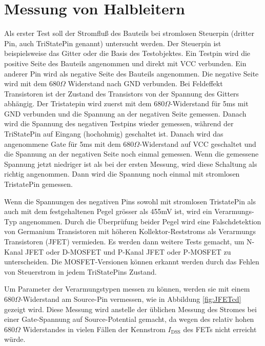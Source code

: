 \section{Messung von Halbleitern}
Als erster Test soll der Stromfluß des Bauteils bei stromlosen Steuerpin (dritter Pin, auch TriStatePin genannt)
untersucht werden. Der Steuerpin ist beispielsweise das Gitter oder die Basis des Testobjektes.
Ein Testpin wird die positive Seite des Bauteils angenommen und direkt mit VCC verbunden.
Ein anderer Pin wird als negative Seite des Bauteils angenommen.
Die negative Seite wird mit dem \(680\Omega\) Widerstand nach GND verbunden.
Bei Feldeffekt Transistoren ist der Zustand des Transistors von der Spannung des Gitters abhängig.
Der Tristatepin wird zuerst mit dem \(680\Omega\)-Widerstand für 5ms mit GND verbunden und
die Spannung an der negativen Seite gemessen.
Danach wird die Spannung des negativen Testpins wieder gemessen, während der TriStatePin auf
Eingang (hochohmig) geschaltet ist.
Danach wird das angenommene Gate für 5ms mit dem \(680\Omega\)-Widerstand auf VCC geschaltet 
und die Spannung an der negativen Seite noch einmal gemessen.
Wenn die gemessene Spannung jetzt niedriger ist als bei der ersten Messung, wird diese Schaltung
als richtig angenommen. Dann wird die Spannung noch einmal mit stromlosen TristatePin gemessen.

Wenn die Spannungen des negativen Pins sowohl mit stromlosen TristatePin als auch mit
dem festgehaltenen Pegel grösser als 455mV ist, wird ein Verarmungs-Typ angenommen.
Durch die Überprüfung beider Pegel wird eine Falschdetektion von Germanium Transistoren mit
höheren Kollektor-Reststroms als Verarmungs Transistoren (JFET) vermieden.
Es werden dann weitere Tests gemacht,
um N-Kanal JFET oder D-MOSFET  und P-Kanal JFET oder P-MOSFET zu unterscheiden.
Die MOSFET-Versionen können erkannt werden durch das Fehlen von Steuerstrom in jedem 
TriStatePins Zustand.

Um Parameter der Verarmungstypen messen zu können, werden sie mit einem \(680 \Omega\)-Widerstand am
Source-Pin vermessen, wie in Abbildung \ref{fig:JFETcd} gezeigt wird. Diese Messung wird anstelle der
üblichen Messung des Stromes bei einer Gate-Spannung auf Source-Potential gemacht, da wegen des
relativ hohen \(680 \Omega\) Widerstandes in vielen Fällen der Kennstrom \(I_\mathrm{DSS}\) 
des FETs nicht erreicht würde.

